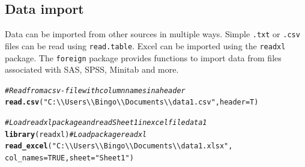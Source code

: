 \documentclass{article}\usepackage[]{graphicx}\usepackage[]{color}
\makeatletter
\newcommand{\hlnum}[1]{\textcolor[rgb]{0.686,0.059,0.569}{#1}}%
\newcommand{\hlstr}[1]{\textcolor[rgb]{0.192,0.494,0.8}{#1}}%
\newcommand{\hlcom}[1]{\textcolor[rgb]{0.678,0.584,0.686}{\textit{#1}}}%
\newcommand{\hlstd}[1]{\textcolor[rgb]{0.345,0.345,0.345}{#1}}%
\newcommand{\hlkwc}[1]{\textcolor[rgb]{0.333,0.667,0.333}{#1}}%
\newcommand{\hlkwd}[1]{\textcolor[rgb]{0.737,0.353,0.396}{\textbf{#1}}}%
\newenvironment{kframe}{%
 \def\at@end@of@kframe{}%
 \ifinner\ifhmode%
  \def\at@end@of@kframe{\end{minipage}}%
  \begin{minipage}{\columnwidth}%
 \fi\fi%
 \def\FrameCommand##1{\hskip\@totalleftmargin \hskip-\fboxsep
 \colorbox{shadecolor}{##1}\hskip-\fboxsep
     \hskip-\linewidth \hskip-\@totalleftmargin \hskip\columnwidth}%
 \MakeFramed {\advance\hsize-\width
   \@totalleftmargin\z@ \linewidth\hsize
   \@setminipage}}%
 {\par\unskip\endMakeFramed%
 \at@end@of@kframe}
\newenvironment{knitrout}{}{} %
\makeatother
\begin{document}
\subsection{Data import}
Data can be imported from other sources in multiple ways. Simple \texttt{.txt} or \texttt{.csv} files can be read using \texttt{read.table}. 
Excel can be imported using the \texttt{readxl} package.
The \texttt{foreign} package provides functions to import data from files associated with SAS, SPSS, Minitab and more.

\begin{knitrout}
\color{fgcolor}\begin{kframe}
\begin{alltt}
\hlcom{#Read from a csv-file with column names in a header}
\hlkwd{read.csv}\hlstd{(}\hlstr{"C:\textbackslash{}\textbackslash{}Users\textbackslash{}\textbackslash{}Bingo\textbackslash{}\textbackslash{}Documents\textbackslash{}\textbackslash{}data1.csv"}\hlstd{,} \hlkwc{header} \hlstd{= T)}

\hlcom{#Load readxl package and read Sheet 1 in excel file data1}
\hlkwd{library}\hlstd{(readxl)} \hlcom{#Load package readxl}
\hlkwd{read_excel}\hlstd{(}\hlstr{"C:\textbackslash{}\textbackslash{}Users\textbackslash{}\textbackslash{}Bingo\textbackslash{}\textbackslash{}Documents\textbackslash{}\textbackslash{}data1.xlsx"}\hlstd{,}
           \hlkwc{col_names}\hlstd{=} \hlnum{TRUE}\hlstd{,} \hlkwc{sheet} \hlstd{=} \hlstr{"Sheet 1"}\hlstd{)}
\end{alltt}
\end{kframe}
\end{knitrout}
\end{document}
